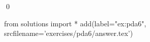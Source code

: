 
\begin{ex} 
  \label{ex:pda6}
  
  \qed
\end{ex} 
\begin{python0}
from solutions import *
add(label="ex:pda6",
    srcfilename='exercises/pda6/answer.tex') 
\end{python0}
